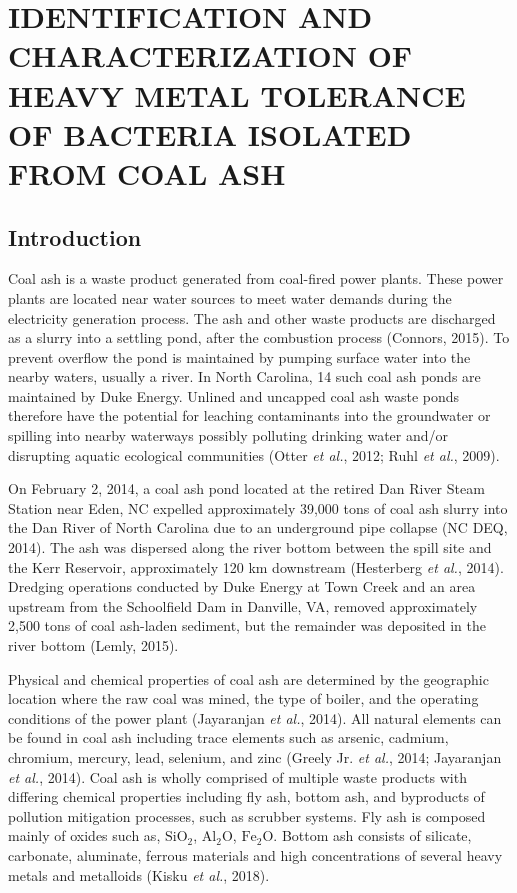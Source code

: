 \documentclass[ms, hidelinks]{uncgdissertationexp}
\theoremstyle{plain}
\theoremstyle{definition}
\theoremstyle{remark}
\begin{document}
\hypertarget{metal}{%
\chapter{IDENTIFICATION AND CHARACTERIZATION OF HEAVY METAL TOLERANCE OF BACTERIA ISOLATED FROM COAL ASH}\label{metal}}

\hypertarget{introduction-1}{%
\section{Introduction}\label{introduction-1}}

Coal ash is a waste product generated from coal-fired power plants. These power plants are located near water sources to meet water demands during the electricity generation process. The ash and other waste products are discharged as a slurry into a settling pond, after the combustion process (Connors, 2015). To prevent overflow the pond is maintained by pumping surface water into the nearby waters, usually a river. In North Carolina, 14 such coal ash ponds are maintained by Duke Energy. Unlined and uncapped coal ash waste ponds therefore have the potential for leaching contaminants into the groundwater or spilling into nearby waterways possibly polluting drinking water and/or disrupting aquatic ecological communities (Otter \emph{et al.}, 2012; Ruhl \emph{et al.}, 2009).

On February 2, 2014, a coal ash pond located at the retired Dan River Steam Station near Eden, NC expelled approximately 39,000 tons of coal ash slurry into the Dan River of North Carolina due to an underground pipe collapse (NC DEQ, 2014). The ash was dispersed along the river bottom between the spill site and the Kerr Reservoir, approximately 120 km downstream (Hesterberg \emph{et al.}, 2014). Dredging operations conducted by Duke Energy at Town Creek and an area upstream from the Schoolfield Dam in Danville, VA, removed approximately 2,500 tons of coal ash-laden sediment, but the remainder was deposited in the river bottom (Lemly, 2015).

Physical and chemical properties of coal ash are determined by the geographic location where the raw coal was mined, the type of boiler, and the operating conditions of the power plant (Jayaranjan \emph{et al.}, 2014). All natural elements can be found in coal ash including trace elements such as arsenic, cadmium, chromium, mercury, lead, selenium, and zinc (Greely Jr. \emph{et al.}, 2014; Jayaranjan \emph{et al.}, 2014). Coal ash is wholly comprised of multiple waste products with differing chemical properties including fly ash, bottom ash, and byproducts of pollution mitigation processes, such as scrubber systems. Fly ash is composed mainly of oxides such as, \(\mathrm{SiO_2}\), \(\mathrm{Al_2O}\), \(\mathrm{Fe_2O}\). Bottom ash consists of silicate, carbonate, aluminate, ferrous materials and high concentrations of several heavy metals and metalloids (Kisku \emph{et al.}, 2018).
\end{document}
